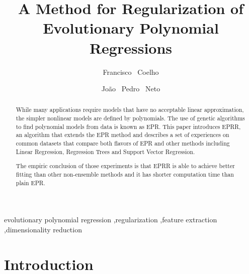 \documentclass[preprint,authoryear,12pt]{elsarticle}
\begin{document}
\begin{frontmatter}

\title{A Method for Regularization of Evolutionary Polynomial Regressions}

\author[ue,labmag]{Francisco ~Coelho}

\author[fcul,labmag]{João ~Pedro ~Neto}


\address[ue]{Dept. Informática, Universidade de Évora, Rua Romão Ramalho 58, 7000-671 Évora}
\address[fcul]{Dept. Informática, Faculdade de Ciências da Universidade de Lisboa, Campo Grande 1749-016 Lisboa}
\address[labmag]{Laboratory of Agent Modelling (LabMAg)}
%
%
\begin{abstract}
While many applications require models that have no acceptable linear approximation, the simpler nonlinear models are defined by polynomials. The use of genetic algorithms to find polynomial models from data is known as \ac{EPR}.
%
This paper introduces \ac{EPRR}, an algorithm that extends the \ac{EPR} method and describes a set of experiences on common datasets that compare both flavors of \ac{EPR} and other methods including Linear Regression, Regression Trees and Support Vector Regression.

The empiric conclusion of those experiments is that \ac{EPRR} is able to achieve better fitting than other non-ensemble methods and it has shorter computation time than plain \ac{EPR}.
\end{abstract}
%
\begin{keyword}
evolutionary polynomial regression \sep regularization \sep feature extraction \sep dimensionality reduction 
\end{keyword}
\end{frontmatter}
%
%
%
%
\section{Introduction}
\end{document}
